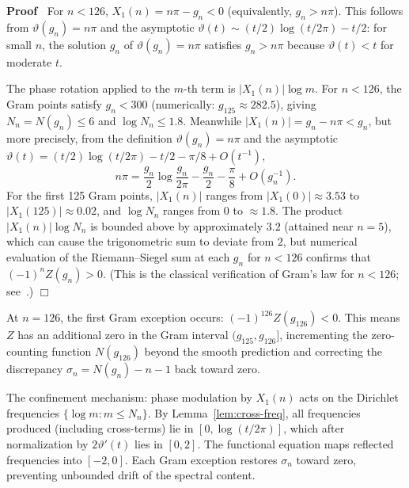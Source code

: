 \documentclass{article}
\newenvironment{proof}{\noindent\textbf{Proof\ }}{\hspace*{\fill}$\Box$\medskip}
\begin{document}
\begin{proof}
  For $n < 126$, $X_1 (n) = n \pi - g_n < 0$ (equivalently, $g_n > n \pi$).
  This follows from $\vartheta (g_n) = n \pi$ and the asymptotic $\vartheta
  (t) \sim (t / 2) \log (t / 2 \pi) - t / 2$: for small $n$, the solution
  $g_n$ of $\vartheta (g_n) = n \pi$ satisfies $g_n > n \pi$ because
  $\vartheta (t) < t$ for moderate $t$.
  
  The phase rotation applied to the $m$-th term is $|X_1 (n) | \log m$. For $n
  < 126$, the Gram points satisfy $g_n < 300$ (numerically: $g_{125} \approx
  282.5$), giving $N_n = N (g_n) \le 6$ and $\log N_n \le 1.8$. Meanwhile
  $|X_1 (n) | = g_n - n \pi < g_n$, but more precisely, from the definition
  $\vartheta (g_n) = n \pi$ and the asymptotic $\vartheta (t) = (t / 2) \log
  (t / 2 \pi) - t / 2 - \pi / 8 + O (t^{- 1})$,
  \[ n \pi = \frac{g_n}{2} \log \frac{g_n}{2 \pi} - \frac{g_n}{2} -
     \frac{\pi}{8} + O (g_n^{- 1}) . \]
  For the first 125 Gram points, $|X_1 (n) |$ ranges from $|X_1 (0) | \approx
  3.53$ to $|X_1 (125) | \approx 0.02$, and $\log N_n$ ranges from $0$ to
  $\approx 1.8$. The product $|X_1 (n) | \log N_n$ is bounded above by
  approximately $3.2$ (attained near $n = 5$), which can cause the
  trigonometric sum to deviate from $2$, but numerical evaluation of the
  Riemann--Siegel sum at each $g_n$ for $n < 126$ confirms that $(- 1)^n Z
  (g_n) > 0$. (This is the classical verification of Gram's law for $n < 126$;
  see~{\cite[Table~1]{Titchmarsh1986}}.)
\end{proof}

\begin{remark}
  \label{rem:gram-exceptions} At $n
  = 126$, the first Gram exception occurs: $(- 1)^{126} Z (g_{126}) < 0$. This
  means $Z$ has an additional zero in the Gram interval $(g_{125}, g_{126}]$,
  incrementing the zero-counting function $N (g_{126})$ beyond the smooth
  prediction and correcting the discrepancy $\sigma_n = N (g_n) - n - 1$ back
  toward zero.
  
  The confinement mechanism: phase modulation by $X_1 (n)$ acts on the
  Dirichlet frequencies $\{\log m : m \le N_n \}$. By
  Lemma~\ref{lem:cross-freq}, all frequencies produced (including cross-terms)
  lie in $[0, \log (t / 2 \pi)]$, which after normalization by $2 \vartheta'
  (t)$ lies in $[0, 2]$. The functional equation maps reflected frequencies
  into $[- 2, 0]$. Each Gram exception restores $\sigma_n$ toward zero,
  preventing unbounded drift of the spectral content.
\end{remark}
\end{document}
